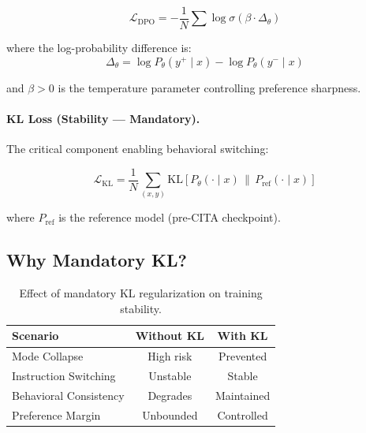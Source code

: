 \begin{equation}
\mathcal{L}_{\text{DPO}} = -\frac{1}{N} \sum \log \sigma \left( \beta \cdot \Delta_\theta \right)
\label{eq:dpo_loss}
\end{equation}

where the log-probability difference is:
\begin{equation}
\Delta_\theta = \log P_\theta(y^+ \mid x) - \log P_\theta(y^- \mid x)
\label{eq:delta}
\end{equation}

and $\beta > 0$ is the temperature parameter controlling preference sharpness.

\paragraph{KL Loss (Stability --- Mandatory).}
The critical component enabling behavioral switching:

\begin{equation}
\mathcal{L}_{\text{KL}} = \frac{1}{N} \sum_{(x,y)} \text{KL}\left[ P_\theta(\cdot \mid x) \,\|\, P_{\text{ref}}(\cdot \mid x) \right]
\label{eq:kl_loss}
\end{equation}

where $P_{\text{ref}}$ is the reference model (pre-CITA checkpoint).

\vspace{-2mm}
\subsection{Why Mandatory KL?}
\label{sec:mandatory_kl}

\begin{table}[h!]
\centering
\small
\begin{tabular}{@{}lcc@{}}
\toprule
\textbf{Scenario} & \textbf{Without KL} & \textbf{With KL} \\
\midrule
Mode Collapse & High risk & Prevented \\
Instruction Switching & Unstable & Stable \\
Behavioral Consistency & Degrades & Maintained \\
Preference Margin & Unbounded & Controlled \\
\bottomrule
\end{tabular}
\caption{Effect of mandatory KL regularization on training stability.}
\label{tab:kl_effects}
\vspace{-4mm}
\end{table}

